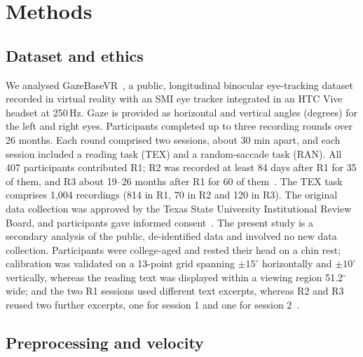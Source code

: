 \section{Methods}

\subsection{Dataset and ethics}

We analysed GazeBaseVR~\citep{lohr2023}, a public, longitudinal binocular eye-tracking dataset recorded in virtual reality with an SMI eye tracker integrated in an HTC Vive headset at 250\,Hz. Gaze is provided as horizontal and vertical angles (degrees) for the left and right eyes. Participants completed up to three recording rounds over 26 months. Each round comprised two sessions, about 30 min apart, and each session included a reading task (TEX) and a random-saccade task (RAN). All 407 participants contributed R1; R2 was recorded at least 84 days after R1 for 35 of them, and R3 about 19--26 months after R1 for 60 of them~\citep{lohr2023}. The TEX task comprises 1,004 recordings (814 in R1, 70 in R2 and 120 in R3). The original data collection was approved by the Texas State University Institutional Review Board, and participants gave informed consent~\citep{lohr2023}. The present study is a secondary analysis of the public, de-identified data and involved no new data collection. Participants were college-aged and rested their head on a chin rest; calibration was validated on a 13-point grid spanning $\pm 15^\circ$ horizontally and $\pm 10^\circ$ vertically, whereas the reading text was displayed within a viewing region 51.2$^\circ$ wide; and the two R1 sessions used different text excerpts, whereas R2 and R3 reused two further excerpts, one for session 1 and one for session 2~\citep{lohr2023}.

\subsection{Preprocessing and velocity}

